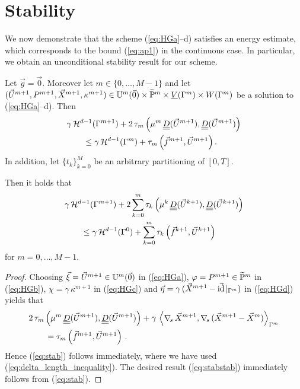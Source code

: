 \section{Stability}\label{sec:stokes_stability}
We now demonstrate that the scheme (\ref{eq:HGa}--d) satisfies an energy
estimate, which corresponds to the bound (\ref{eq:ap1}) in the continuous case.
In particular, we obtain an unconditional stability result for our scheme.

\begin{theorem} \label{thm:stabstab}
\sloppy Let $\vec g=\vec 0$. Moreover let $m \in \{0,\ldots,M-1\}$ and let
${(\vec U^{m+1},P^{m+1},\vec X^{m+1}, \kappa^{m+1}) \in \uspacedisc{0}{m}\times
\pnormspace^m \times \Vh \times \Wh}$ be a solution to (\ref{eq:HGa}--d). Then
\begin{align}\label{eq:stab}
& \gamma\, \surfvol(\Gamma^{m+1})+ 2\,\tau_m\left(\mu^m\,\mat D(\vec U^{m+1}),
\mat D(\vec U^{m+1}) \right) \nonumber \\
& \qquad \leq \gamma\,\surfvol(\Gamma^m) + \tau_m\left( \vec f^{m+1},
\vec U^{m+1} \right).
\end{align}
In addition, let $\{t_k\}_{k=0}^M$ be an arbitrary partitioning of $[0,T]$.

Then it holds that
\begin{align}\label{eq:stabstab}
& \gamma\,\surfvol(\Gamma^{m+1}) + 2 \sum_{k=0}^m  \tau_k\left(\mu^k\,
\mat D(\vec U^{k+1}), \mat D(\vec U^{k+1}) \right) \nonumber \\
& \qquad \leq \gamma\,\surfvol(\Gamma^0) + \sum_{k=0}^m \tau_k\left(\vec
f^{k+1}, \vec U^{k+1} \right)
\end{align}
for $m=0,\ldots, M-1$.
\end{theorem}
\begin{proof}
Choosing $\vec\xi = \vec U^{m+1} \in \uspacedisc{0}{m}$ in (\ref{eq:HGa}),
$\varphi = P^{m+1} \in \pnormspace^m$ in (\ref{eq:HGb}),
$\chi = \gamma\,\kappa^{m+1}$ in (\ref{eq:HGc}) and
$\vec\eta=\gamma\,({\vec X^{m+1}-\vec\id\!\mid_{\Gamma^m}})$ in (\ref{eq:HGd})
yields that
\begin{align*}
& 2\,\tau_m\left(\mu^m\,\mat D(\vec U^{m+1}), \mat D(\vec U^{m+1}) \right)
+ \gamma\,\left\langle \nabs\,\vec X^{m+1}, \nabs\,(\vec X^{m+1} - \vec X^m)
\right\rangle_{\Gamma^m} \nonumber \\
& \qquad = \tau_m\left(\vec f^{m+1}, \vec U^{m+1} \right)\,.
\end{align*}
Hence (\ref{eq:stab}) follows immediately, where we have used
(\ref{eq:delta_length_inequality}). The desired result (\ref{eq:stabstab})
immediately follows from (\ref{eq:stab}).
\end{proof}

